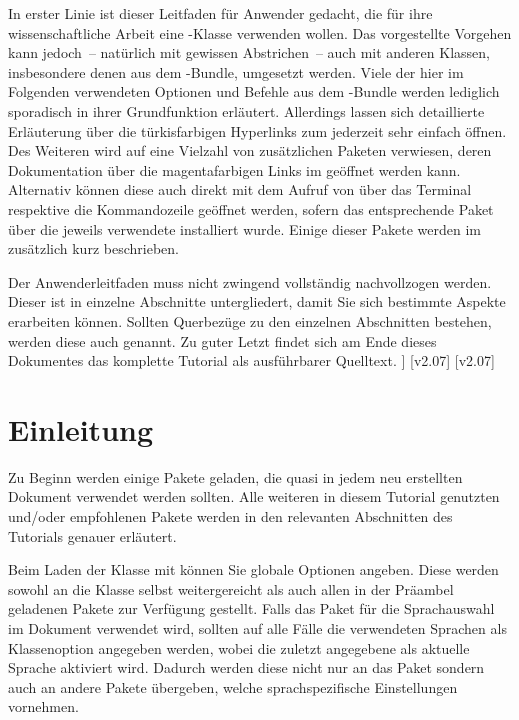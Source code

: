 \documentclass[%
  english,ngerman,%
  cdgeometry=no,DIV=12,%
  cd=false,cdfont=false,cdtitle=true,%
  headings=normal,%
  automark,%
  listof=toc,%
]{tudscrartcl}
\begin{document}
  In erster Linie ist dieser Leitfaden für Anwender gedacht, die für ihre
  wissenschaftliche Arbeit eine \TUDScript-Klasse verwenden wollen. Das 
  vorgestellte Vorgehen kann jedoch~-- natürlich mit gewissen Abstrichen~-- 
  auch mit anderen Klassen, insbesondere denen aus dem \KOMAScript-Bundle, 
  umgesetzt werden. Viele der hier im Folgenden verwendeten Optionen und
  Befehle aus dem \TUDScript-Bundle werden lediglich sporadisch in ihrer 
  Grundfunktion erläutert. Allerdings lassen sich detaillierte Erläuterung 
  über die türkisfarbigen Hyperlinks zum  
  jederzeit sehr einfach öffnen. Des Weiteren wird auf eine Vielzahl von 
  zusätzlichen Paketen verwiesen, deren Dokumentation über die magentafarbigen 
  Links im \CTAN geöffnet werden kann. Alternativ können diese auch direkt mit 
  dem Aufruf von  über das Terminal respektive die 
  Kommandozeile geöffnet werden, sofern das entsprechende Paket über die 
  jeweils verwendete \Distro* installiert wurde. Einige dieser Pakete werden im 
   zusätzlich kurz beschrieben.
  
  Der Anwenderleitfaden muss nicht zwingend vollständig nachvollzogen werden. 
  Dieser ist in einzelne Abschnitte untergliedert, damit Sie sich bestimmte 
  Aspekte erarbeiten können. Sollten Querbezüge zu den einzelnen Abschnitten 
  bestehen, werden diese auch genannt. Zu guter Letzt findet sich am Ende 
  dieses Dokumentes das komplette Tutorial als ausführbarer Quelltext. 
]
\tableofcontents
{}[v2.07]
[v2.07]
\clearpage



\section{%
  Einleitung%
  \label{sec:introduction}%
}

Zu Beginn werden einige Pakete geladen, die quasi in jedem neu erstellten 
Dokument verwendet werden sollten. Alle weiteren in diesem Tutorial genutzten 
und/oder empfohlenen Pakete werden in den relevanten Abschnitten des Tutorials 
genauer erläutert.

Beim Laden der Klasse mit  können Sie globale Optionen 
angeben. Diese werden sowohl an die Klasse selbst weitergereicht als auch allen 
in der Präambel geladenen Pakete zur Verfügung gestellt. Falls das Paket 
 für die Sprachauswahl im Dokument verwendet wird, sollten auf 
alle Fälle die verwendeten Sprachen als Klassenoption angegeben werden, wobei 
die zuletzt angegebene als aktuelle Sprache aktiviert wird. Dadurch werden 
diese nicht nur an das Paket  sondern auch an andere Pakete 
übergeben, welche sprachspezifische Einstellungen vornehmen.
%
\end{document}

